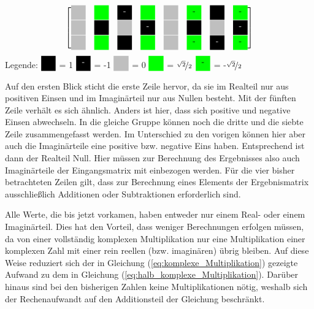 \begin{minipage}{0.9\textwidth}
\begin{center}
\[{\begin{bmatrix}
     \myboxZero 	& \myboxSqrtPos 	& \myboxOneNeg 	& \myboxSqrtPos		& \myboxZero 	& \myboxSqrtNeg 	& \myboxOnePos 	& \myboxSqrtNeg \\
     \myboxZero 	& \myboxOnePos 		& \myboxZero 	& \myboxOneNeg 		& \myboxZero 	& \myboxOnePos 		& \myboxZero 	& \myboxOneNeg \\
     \myboxZero 	& \myboxSqrtPos 	& \myboxOnePos 	& \myboxSqrtPos		& \myboxZero	& \myboxSqrtNeg		& \myboxOneNeg	& \myboxSqrtNeg 
    \end{bmatrix}
   }
  \]
\vspace{0.5cm}
  Legende: $\myboxOnePos$ = 1 \quad $\myboxOneNeg$ = -1 \quad $\myboxZero$ = 0 \quad $\myboxSqrtPos$ = $\nicefrac{\sqrt{2}}{2}$ \quad $\myboxSqrtNeg$ = -$\nicefrac{\sqrt{2}}{2}$
  \label{pic:MatrizenDarstellungTwiddlefaktoren}
\end{center}
\endgroup
\end{minipage}


\vspace{0.5cm}
 
 Auf den ersten Blick sticht die erste Zeile hervor, da sie im Realteil nur aus positiven Einsen und im Imaginärteil nur aus Nullen besteht.
 Mit der fünften Zeile verhält es sich ähnlich. Anders ist hier, dass sich positive und negative Einsen abwechseln.
 In die gleiche Gruppe können noch die dritte und die siebte Zeile zusammengefasst werden. 
 Im Unterschied zu den vorigen können hier aber auch die Imaginärteile eine positive bzw. negative Eins haben. Entsprechend ist dann der Realteil
 Null. Hier müssen zur Berechnung des Ergebnisses also auch Imaginärteile der Eingangsmatrix mit einbezogen werden.
 Für die vier bisher betrachteten Zeilen gilt, dass zur Berechnung eines Elements der Ergebnismatrix ausschließlich Additionen oder Subtraktionen erforderlich sind. 
 
 
 Alle Werte, die bis jetzt vorkamen, haben entweder nur einem Real- oder einem Imaginärteil. 
 Dies hat den Vorteil, dass weniger Berechnungen erfolgen müssen, da von einer vollständig komplexen Multiplikation nur eine Multiplikation einer komplexen Zahl mit einer
 rein reellen (bzw. imaginären) übrig bleiben. Auf diese Weise reduziert sich der in Gleichung (\ref{eq:komplexe_Multiplikation}) gezeigte Aufwand zu dem in Gleichung (\ref{eq:halb_komplexe_Multiplikation}).
 Darüber hinaus sind bei den bisherigen Zahlen keine Multiplikationen nötig, weshalb sich der Rechenaufwandt auf den Additionsteil der Gleichung beschränkt.
 
